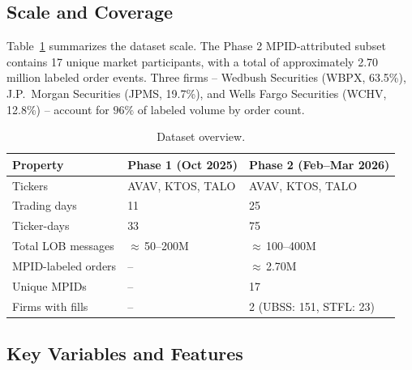 \documentclass[11pt, letterpaper]{article}
\begin{document}
\subsection{Scale and Coverage}

Table~\ref{tab:data_overview} summarizes the dataset scale.
The Phase 2 MPID-attributed subset contains 17 unique market participants,
with a total of approximately 2.70 million labeled order events.
Three firms -- Wedbush Securities (WBPX, 63.5\%), J.P.\ Morgan Securities
(JPMS, 19.7\%), and Wells Fargo Securities (WCHV, 12.8\%) -- account for
$96\%$ of labeled volume by order count.

\begin{table}[H]
\centering
\caption{Dataset overview.}
\label{tab:data_overview}
\begin{tabularx}{\textwidth}{@{} l X X @{}}
\toprule
\textbf{Property} & \textbf{Phase 1 (Oct 2025)} & \textbf{Phase 2 (Feb--Mar 2026)} \\
\midrule
Tickers & AVAV, KTOS, TALO & AVAV, KTOS, TALO \\
Trading days & 11 & 25 \\
Ticker-days & 33 & 75 \\
Total LOB messages & ${\approx}$\,50--200M & ${\approx}$\,100--400M \\
MPID-labeled orders & --  & ${\approx}$\,2.70M \\
Unique MPIDs & -- & 17 \\
Firms with fills & -- & 2 (UBSS: 151, STFL: 23) \\
\bottomrule
\end{tabularx}
\end{table}

\subsection{Key Variables and Features}
\end{document}
